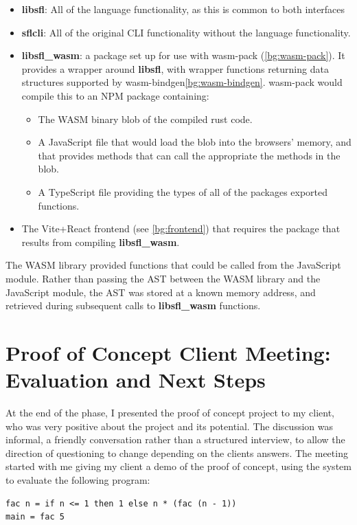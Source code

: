 \begin{itemize}
    \item \textbf{libsfl}: All of the language functionality, as this is common to both interfaces
    \item \textbf{sflcli}: All of the original CLI functionality without the language functionality.  
    \item \textbf{libsfl\_wasm}: a package set up for use with wasm-pack (\ref{bg:wasm-pack}). It provides a wrapper around \textbf{libsfl}, with wrapper functions returning data structures supported by wasm-bindgen\ref{bg:wasm-bindgen}. wasm-pack would compile this to an \ac{NPM} package containing:
    \begin{itemize}
        \item The WASM binary blob of the compiled rust code.
        \item A JavaScript file that would load the blob into the browsers' memory, and that provides methods that can call the appropriate the methods in the blob.
        \item A TypeScript file providing the types of all of the packages exported functions. 
    \end{itemize}
    \item The Vite+React frontend (see \ref{bg:frontend}) that requires the package that results from compiling \textbf{libsfl\_wasm}.
\end{itemize}

The \ac{WASM} library provided functions that could be called from the JavaScript module. Rather than passing the \ac{AST} between the \ac{WASM} library and the JavaScript module, the \ac{AST} was stored at a known memory address, and retrieved during subsequent calls to \textbf{libsfl\_wasm} functions. 

\section{Proof of Concept Client Meeting: Evaluation and \newline Next Steps}
\label{eval:c1_client}
At the end of the phase, I presented the proof of concept project to my client, who was very positive about the project and its potential. The discussion was informal, a friendly conversation rather than a structured interview, to allow the direction of questioning to change depending on the clients answers. The meeting started with me giving my client a demo of the proof of concept, using the system to evaluate the following program:
\begin{verbatim}
fac n = if n <= 1 then 1 else n * (fac (n - 1))
main = fac 5
\end{verbatim}

